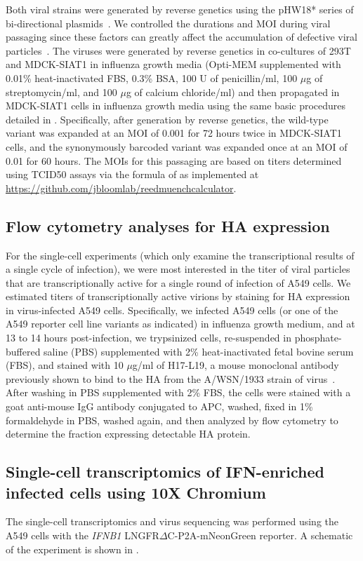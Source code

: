 \documentclass[9pt,lineno]{elife}
\begin{document}
Both viral strains were generated by reverse genetics using the pHW18* series of bi-directional plasmids~\citep{hoffmann2000dna}.
We controlled the durations and MOI during viral passaging since these factors can greatly affect the accumulation of defective viral particles~\citep{xue2016propagation}.
The viruses were generated by reverse genetics in co-cultures of 293T and MDCK-SIAT1 in influenza growth media (Opti-MEM supplemented with 0.01\% heat-inactivated FBS, 0.3\% BSA, 100 U of penicillin/ml, 100 $\mu$g of streptomycin/ml, and 100 $\mu$g of calcium chloride/ml) and then propagated in MDCK-SIAT1 cells in influenza growth media using the same basic procedures detailed in \citet{russell2018extreme}.
Specifically, after generation by reverse genetics, the wild-type variant was expanded at an MOI of 0.001 for 72 hours twice in MDCK-SIAT1 cells, and the synonymously barcoded variant was expanded once at an MOI of 0.01 for 60 hours.
The MOIs for this passaging are based on titers determined using TCID50 assays via the formula of \citet{reed1938simple} as implemented at \url{https://github.com/jbloomlab/reedmuenchcalculator}.

\subsection{Flow cytometry analyses for HA expression}
For the single-cell experiments (which only examine the transcriptional results of a single cycle of infection), we were most interested in the titer of viral particles that are transcriptionally active for a single round of infection of A549 cells.
We estimated titers of transcriptionally active virions by staining for HA expression in virus-infected A549 cells.
Specifically, we infected A549 cells (or one of the A549 reporter cell line variants as indicated) in influenza growth medium, and at 13 to 14 hours post-infection, we trypsinized cells, re-suspended in phosphate-buffered saline (PBS) supplemented with 2\% heat-inactivated fetal bovine serum (FBS), and stained with 10 $\mu$g/ml of H17-L19, a mouse monoclonal antibody previously shown to bind to the HA from the A/WSN/1933 strain of virus~\citep{doud2017complete}.
After washing in PBS supplemented with 2\% FBS, the cells were stained with a goat anti-mouse IgG antibody conjugated to APC, washed, fixed in 1\% formaldehyde in PBS, washed again, and then analyzed by flow cytometry to determine the fraction expressing detectable HA protein.

\subsection{Single-cell transcriptomics of IFN-enriched infected cells using 10X Chromium}
The single-cell transcriptomics and virus sequencing was performed using the A549 cells with the \textit{IFNB1} LNGFR$\Delta$C-P2A-mNeonGreen reporter.
A schematic of the experiment is shown in .
\end{document}
